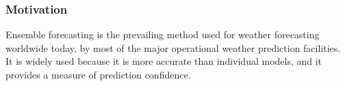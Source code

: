 \documentclass[../paper.tex]{subfiles}
\begin{document}
\subsubsection{Motivation}
    Ensemble forecasting is the prevailing method used for weather forecasting worldwide today, by most of the major operational weather prediction facilities.
    It is widely used because it is more accurate than individual models, and it provides a measure of prediction confidence.
\end{document}
